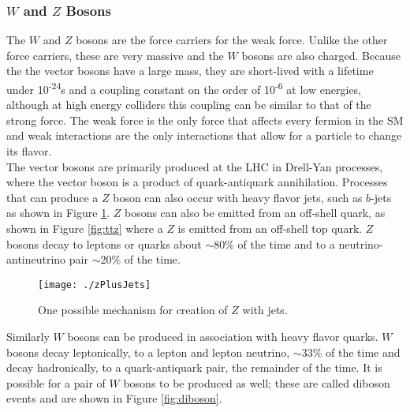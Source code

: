	
	\subsubsection{\boldmath$W$ and \boldmath$Z$ Bosons}
	
	The $W$ and $Z$ bosons are the force carriers for the weak force.  Unlike the other force carriers, these are very massive and the $W$ bosons are also charged.  Because the the vector bosons have a large mass, they are short-lived with a lifetime under 10\textsuperscript{-24}s and a coupling constant on the order of 10\textsuperscript{-6} at low energies, although at high energy colliders this coupling can be similar to that of the strong force.  The weak force is the only force that affects every fermion in the SM and weak interactions are the only interactions that allow for a particle to change its flavor.  \\ %
	
	The vector bosons are primarily produced at the LHC in Drell-Yan processes, where the vector boson is a product of quark-antiquark annihilation.  Processes that can produce a $Z$ boson can also occur with heavy flavor jets, such as $b$-jets as shown in Figure \ref{fig:zplusjets}.  $Z$ bosons can also be emitted from an off-shell quark, as shown in Figure \ref{fig:ttz} where a $Z$ is emitted from an off-shell top quark.  $Z$ bosons decay to leptons or quarks about $\sim$80\% of the time and to a neutrino-antineutrino pair $\sim$20\% of the time\cite{pdg}.  \\%
	
\begin{figure}[h!]
  \centering
	\texttt{[image: ./zPlusJets]}
\caption[$Z$ with jets production mechanism]{\label{fig:zplusjets}{ One possible mechanism for creation of $Z$ with jets. }} 
\end{figure}	
	
	Similarly $W$ bosons can be produced in association with heavy flavor quarks.  $W$ bosons decay leptonically, to a lepton and lepton neutrino, $\sim$33\% of the time and decay hadronically, to a quark-antiquark pair, the remainder of the time.  It is possible for a pair of $W$ bosons to be produced as well; these are called diboson events and are shown in Figure \ref{fig:diboson}. \\
	

